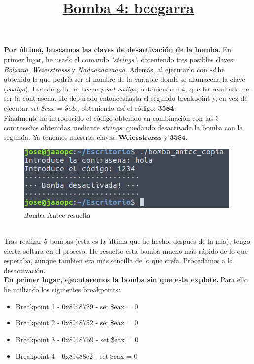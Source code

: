 \documentclass[11pt,a4paper]{article}
\begin{document}
\textbf{Por último, buscamos las claves de desactivación de la bomba.} En primer lugar, he usado el comando \emph{"strings"}, obteniendo tres posibles claves: \emph{Bolzano}, \emph{Weierstrasss} y \emph{Nadaaaaaaaaaa}. Además, al ejecutarlo con \emph{-d} he obtenido lo que podría ser el nombre de la variable donde se alamacena la clave (\emph{codigo}). 
Usando gdb, he hecho \emph{print codigo}, obteniendo n 4, que ha resultado no ser la contraseña. He depurado entonceshasta el segundo breakpoint y, en vez de ejecutar \emph{set \$eax = \$edx}, obteniendo así el código: \textbf{3584}. \\
Finalmente he introducido el código obtenido en combinación con las 3 contraseñas obtenidas mediante \emph{strings}, quedando desactivada la bomba con la segunda. Ya tenemos nuestras claves: \textbf{Weierstrasss} y \textbf{3584}. \\

\begin{figure}[H] 
	\centering
	\includegraphics[scale=0.45]{capturas/antcc2.png} 
	\caption{Bomba Antcc resuelta} \label{fig:figura25}
\end{figure}

\title{\large{\textbf{\underline{Bomba 4: bcegarra}}}} \\

Tras realizar 5 bombas (esta es la última que he hecho, después de la mía), tengo cierta soltura en el proceso. He resuelto esta bomba mucho más rápido de lo que esperaba, aunque también era más sencilla de lo que creía. Procedamos a la desactivación. \\

\textbf{En primer lugar, ejecutaremos la bomba sin que esta explote.} Para ello he utilizado los siguientes breakpoints:

\begin{itemize}
	\item Breakpoint 1 - 0x8048729 - set \$eax = 0
	\item Breakpoint 2 - 0x8048752 - set \$eax = 0
	\item Breakpoint 3 - 0x80487b9 - set \$eax = 0
	\item Breakpoint 4 - 0x80488e2 - set \$eax = 0
\end{itemize}
\end{document}
